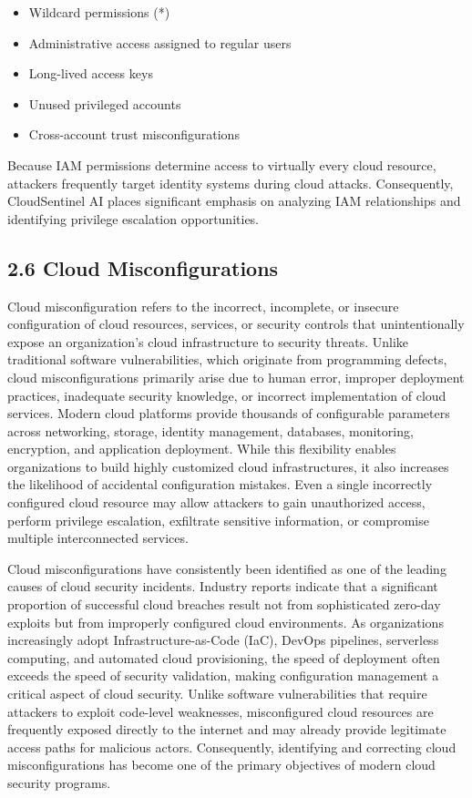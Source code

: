 \begin{itemize}
\tightlist
\item
  Wildcard permissions (*)\\
\item
  Administrative access assigned to regular users\\
\item
  Long-lived access keys\\
\item
  Unused privileged accounts\\
\item
  Cross-account trust misconfigurations
\end{itemize}

Because IAM permissions determine access to virtually every cloud resource, attackers frequently target identity systems during cloud attacks. Consequently, CloudSentinel AI places significant emphasis on analyzing IAM relationships and identifying privilege escalation opportunities.

\subsection{2.6 Cloud Misconfigurations}

Cloud misconfiguration refers to the incorrect, incomplete, or insecure configuration of cloud resources, services, or security controls that unintentionally expose an organization's cloud infrastructure to security threats. Unlike traditional software vulnerabilities, which originate from programming defects, cloud misconfigurations primarily arise due to human error, improper deployment practices, inadequate security knowledge, or incorrect implementation of cloud services. Modern cloud platforms provide thousands of configurable parameters across networking, storage, identity management, databases, monitoring, encryption, and application deployment. While this flexibility enables organizations to build highly customized cloud infrastructures, it also increases the likelihood of accidental configuration mistakes. Even a single incorrectly configured cloud resource may allow attackers to gain unauthorized access, perform privilege escalation, exfiltrate sensitive information, or compromise multiple interconnected services.

Cloud misconfigurations have consistently been identified as one of the leading causes of cloud security incidents. Industry reports indicate that a significant proportion of successful cloud breaches result not from sophisticated zero-day exploits but from improperly configured cloud environments. As organizations increasingly adopt Infrastructure-as-Code (IaC), DevOps pipelines, serverless computing, and automated cloud provisioning, the speed of deployment often exceeds the speed of security validation, making configuration management a critical aspect of cloud security. Unlike software vulnerabilities that require attackers to exploit code-level weaknesses, misconfigured cloud resources are frequently exposed directly to the internet and may already provide legitimate access paths for malicious actors. Consequently, identifying and correcting cloud misconfigurations has become one of the primary objectives of modern cloud security programs.

